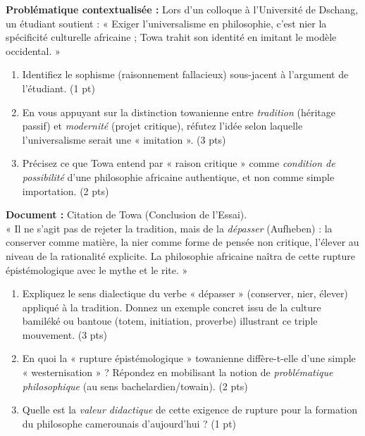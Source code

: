 \documentclass[11pt]{article}
\begin{document}
\begin{exercice}
\textbf{Problématique contextualisée :} Lors d'un colloque à l'Université de Dschang, un étudiant soutient : « Exiger l'universalisme en philosophie, c'est nier la spécificité culturelle africaine ; Towa trahit son identité en imitant le modèle occidental. »
\begin{enumerate}
    \item Identifiez le sophisme (raisonnement fallacieux) sous-jacent à l'argument de l'étudiant. (1 pt)
    \item En vous appuyant sur la distinction towanienne entre \textit{tradition} (héritage passif) et \textit{modernité} (projet critique), réfutez l'idée selon laquelle l'universalisme serait une « imitation ». (3 pts)
    \item Précisez ce que Towa entend par « raison critique » comme \textit{condition de possibilité} d'une philosophie africaine authentique, et non comme simple importation. (2 pts)
\end{enumerate}
\end{exercice}

\begin{exercice}
\textbf{Document :} Citation de Towa (Conclusion de l'Essai).\\
« Il ne s'agit pas de rejeter la tradition, mais de la \textit{dépasser} (Aufheben) : la conserver comme matière, la nier comme forme de pensée non critique, l'élever au niveau de la rationalité explicite. La philosophie africaine naîtra de cette rupture épistémologique avec le mythe et le rite. »
\begin{enumerate}
    \item Expliquez le sens dialectique du verbe « dépasser » (conserver, nier, élever) appliqué à la tradition. Donnez un exemple concret issu de la culture bamiléké ou bantoue (totem, initiation, proverbe) illustrant ce triple mouvement. (3 pts)
    \item En quoi la « rupture épistémologique » towanienne diffère-t-elle d'une simple « westernisation » ? Répondez en mobilisant la notion de \textit{problématique philosophique} (au sens bachelardien/towain). (2 pts)
    \item Quelle est la \textit{valeur didactique} de cette exigence de rupture pour la formation du philosophe camerounais d'aujourd'hui ? (1 pt)
\end{enumerate}
\end{exercice}
\end{document}
